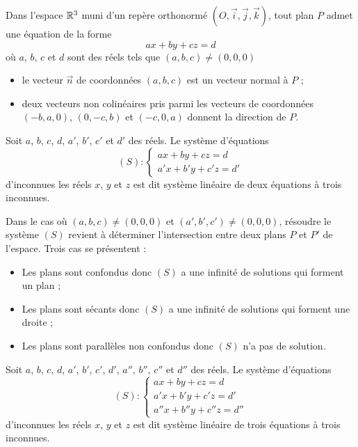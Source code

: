 \begin{defprop}
	Dans l'espace \(\mathbb{R}^3\) muni d’un repère orthonormé \((O,\vec{i},\vec{j},\vec{k})\), tout plan \(P\) admet une équation de la forme
	\[ax + by + cz = d\]
	où \(a\), \(b\), \(c\) et \(d\) sont des réels tels que \((a,b,c)\neq (0,0,0)\)
	\begin{itemize}
		\item le vecteur \(\vec{n}\) de coordonnées \((a,b,c)\) est un vecteur normal à \(P\) ;
		\item deux vecteurs non colinéaires pris parmi les vecteurs de coordonnées \((-b,a,0)\), \((0,-c,b)\) et \((-c,0,a)\) donnent la direction de \(P\).
	\end{itemize}
\end{defprop}

\begin{defprop}
	Soit \(a\), \(b\), \(c\), \(d\), \(a'\), \(b'\), \(c'\) et \(d'\) des réels. Le système d’équations
	\[
		(S) :
		\begin{cases}
			ax + by + cz = d \\
			a'x + b'y + c'z = d'
		\end{cases}
	\]
	d’inconnues les réels \(x\), \(y\) et \(z\) est dit système linéaire de deux équations à trois inconnues.
\end{defprop}

\begin{defprop}
	Dans le cas où \((a,b,c)\neq (0,0,0)\) et \((a',b',c')\neq (0,0,0)\), résoudre le système \((S)\) revient à déterminer l’intersection entre deux plans \(P\) et \(P'\) de l’espace.
	Trois cas se présentent :
	\begin{itemize}
		\item Les plans sont confondus donc \((S)\) a une infinité de solutions qui forment un plan ;
		\item Les plans sont sécants donc \((S)\) a une infinité de solutions qui forment une droite ;
		\item Les plans sont parallèles non confondus donc \((S)\) n’a pas de solution.
	\end{itemize}
\end{defprop}
\begin{defprop}
	Soit \(a\), \(b\), \(c\), \(d\), \(a'\), \(b'\), \(c'\), \(d'\), \(a''\), \(b''\), \(c''\) et \(d''\) des réels. Le système d’équations
	\[ (S) : \begin{cases}
			ax + by + cz = d     \\
			a'x + b'y + c'z = d' \\
			a''x + b''y + c''z = d''
		\end{cases} \]
	d’inconnues les réels \(x\), \(y\) et \(z\) est dit système linéaire de trois équations à trois inconnues.
\end{defprop}

